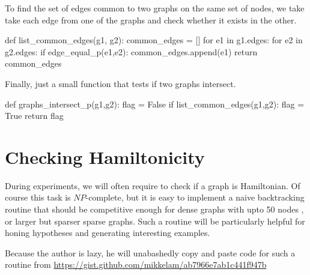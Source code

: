 To find the set of edges common to two graphs on the same set of nodes, we take take each
edge from one of the graphs and check whether it exists in the other. 


\nwenddocs{}\plusendmoddef\nwstartdeflinemarkup{}\nwenddeflinemarkup
def list_common_edges(g1, g2):
     common_edges = []
     for e1 in g1.edges:
          for e2 in g2.edges:
             if  edge_equal_p(e1,e2):
                  common_edges.append(e1)
     return common_edges
\nwendcode{}\nwdocspar

Finally, just a small function that tests if two graphs intersect. 

\nwenddocs{}\plusendmoddef\nwstartdeflinemarkup{}\nwenddeflinemarkup
def graphs_intersect_p(g1,g2):
     flag = False
     if list_common_edges(g1,g2):     
          flag = True 
     return flag
\nwendcode{}\nwdocspar

\section{Checking Hamiltonicity}

During experiments, we will often require to check if a graph is Hamiltonian. Of course
this task is $NP$-complete, but it is easy to implement a naive backtracking routine 
that should be competitive enough for dense graphs with upto 50 nodes , 
or larger but sparser sparse graphs. Such a routine will be particularly helpful
for honing hypotheses and generating interesting examples. 

Because the author is lazy, he will unabashedly copy and paste code for such a routine from  
\url{https://gist.github.com/mikkelam/ab7966e7ab1c441f947b}

